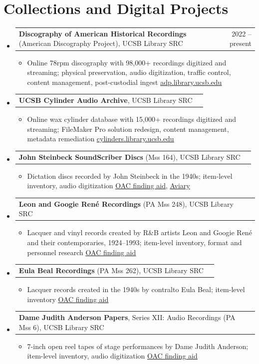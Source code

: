 \documentclass[letterpaper,10pt]{article}
\makeatletter
\newlength{\entrygap}   \setlength{\entrygap}{1pt}   %
\newlength{\listendgap} \setlength{\listendgap}{-4pt}  %
\newlength{\bulletgap}  \setlength{\bulletgap}{0pt}  %
\newlength{\groupindent}\setlength{\groupindent}{0.15in} %
\newcommand{\resumeItem}[1]{\item \small{#1}}
\newif\ifresumecont \resumecontfalse
\newcommand{\resumeProjectHeading}[2]{%
  \vspace{\entrygap}\item
    \begin{tabular*}{0.97\textwidth}[t]{l@{\extracolsep{\fill}}r}
      \small#1 & \small#2 \\
    \end{tabular*}%
}
\newcommand{\resumeSubHeadingListStart}{%
  \begin{itemize}[leftmargin=0.15in, label={},
                  itemsep=0pt, parsep=0pt, topsep=2pt, partopsep=0pt]}
\newcommand{\resumeSubHeadingListEnd}{\ifresumecont\vspace{\listendgap}\fi\end{itemize}}
\newcommand{\resumeItemListStart}{%
  \begin{itemize}[leftmargin=\groupindent, itemsep=\bulletgap,
                  parsep=0pt, topsep=1pt, partopsep=0pt]}
\newcommand{\resumeItemListEnd}{\resumecontfalse\end{itemize}}
\newcommand{\lnk}[2]{{\scriptsize\href{#1}{\underline{#2}}}}
\makeatother
\begin{document}
\section{Collections and Digital Projects}
  \resumeSubHeadingListStart
    \resumeProjectHeading
      {\textbf{Discography of American Historical Recordings} (American Discography Project), UCSB Library SRC}{2022 -- present}
      \resumeItemListStart
        \resumeItem{Online 78rpm discography with 98,000+ recordings digitized and streaming; physical preservation, audio digitization, traffic control, content management, post-custodial ingest \lnk{https://adp.library.ucsb.edu}{adp.library.ucsb.edu}}
      \resumeItemListEnd
    \resumeProjectHeading
      {\textbf{UCSB Cylinder Audio Archive}, UCSB Library SRC}{}
      \resumeItemListStart
        \resumeItem{Online wax cylinder database with 15,000+ recordings digitized and streaming; FileMaker Pro solution redesign, content management, metadata remediation \lnk{https://cylinders.library.ucsb.edu}{cylinders.library.ucsb.edu}}
      \resumeItemListEnd
    \resumeProjectHeading
      {\textbf{John Steinbeck SoundScriber Discs} (Mss 164), UCSB Library SRC}{}
      \resumeItemListStart
        \resumeItem{Dictation discs recorded by John Steinbeck in the 1940s; item-level inventory, audio digitization \lnk{https://oac.cdlib.org/findaid/ark:/13030/kt4489q2nz}{OAC finding aid}, \lnk{https://ucsblibrarysrc.aviaryplatform.com/collections/3890}{Aviary}}
      \resumeItemListEnd
    \resumeProjectHeading
      {\textbf{Leon and Googie Ren\'e Recordings} (PA Mss 248), UCSB Library SRC}{}
      \resumeItemListStart
        \resumeItem{Lacquer and vinyl records created by R\&B artists Leon and Googie Ren\'e and their contemporaries, 1924--1993; item-level inventory, format and personnel research \lnk{https://oac.cdlib.org/findaid/ark:/13030/c8qj7rnt}{OAC finding aid}}
      \resumeItemListEnd
    \resumeProjectHeading
      {\textbf{Eula Beal Recordings} (PA Mss 262), UCSB Library SRC}{}
      \resumeItemListStart
        \resumeItem{Lacquer records created in the 1940s by contralto Eula Beal; item-level inventory \lnk{https://oac.cdlib.org/findaid/ark:/13030/c8bz6f4q}{OAC finding aid}}
      \resumeItemListEnd
    \resumeProjectHeading
      {\textbf{Dame Judith Anderson Papers}, Series XII: Audio Recordings (PA Mss 6), UCSB Library SRC}{}
      \resumeItemListStart
        \resumeItem{7-inch open reel tapes of stage performances by Dame Judith Anderson; item-level inventory, audio digitization \lnk{https://oac.cdlib.org/findaid/ark:/13030/tf8x0nb6v0}{OAC finding aid}}
      \resumeItemListEnd
  \resumeSubHeadingListEnd
\end{document}
